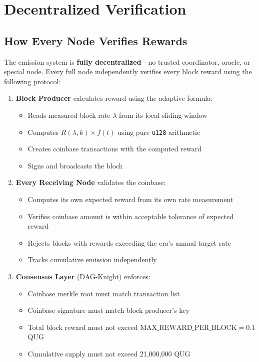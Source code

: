 \documentclass[11pt,a4paper]{article}
\begin{document}
\section{Decentralized Verification}
\label{sec:decentralized}

\subsection{How Every Node Verifies Rewards}

The emission system is \textbf{fully decentralized}---no trusted coordinator, oracle, or special node. Every full node independently verifies every block reward using the following protocol:

\begin{enumerate}
    \item \textbf{Block Producer} calculates reward using the adaptive formula:
    \begin{itemize}
        \item Reads measured block rate $\lambda$ from its local sliding window
        \item Computes $R(\lambda, k) \times f(t)$ using pure \texttt{u128} arithmetic
        \item Creates coinbase transactions with the computed reward
        \item Signs and broadcasts the block
    \end{itemize}

    \item \textbf{Every Receiving Node} validates the coinbase:
    \begin{itemize}
        \item Computes its own expected reward from its own rate measurement
        \item Verifies coinbase amount is within acceptable tolerance of expected reward
        \item Rejects blocks with rewards exceeding the era's annual target rate
        \item Tracks cumulative emission independently
    \end{itemize}

    \item \textbf{Consensus Layer} (DAG-Knight) enforces:
    \begin{itemize}
        \item Coinbase merkle root must match transaction list
        \item Coinbase signature must match block producer's key
        \item Total block reward must not exceed $\text{MAX\_REWARD\_PER\_BLOCK} = 0.1$ QUG
        \item Cumulative supply must not exceed 21,000,000 QUG
    \end{itemize}
\end{enumerate}
\end{document}
